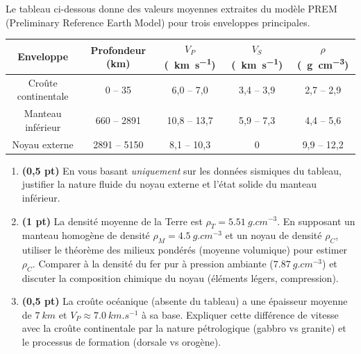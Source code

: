 \documentclass[11pt]{article}
\begin{document}
\begin{exercice}
Le tableau ci-dessous donne des valeurs moyennes extraites du modèle PREM (Preliminary Reference Earth Model) pour trois enveloppes principales.

\begin{center}
\begin{tabular}{|c|c|c|c|c|}
\hline
\textbf{Enveloppe} & \textbf{Profondeur (km)} & $V_P$ (\SI{}{km.s^{-1}}) & $V_S$ (\SI{}{km.s^{-1}}) & $\rho$ (\SI{}{g.cm^{-3}}) \\
\hline
Croûte continentale & 0 -- 35 & 6,0 -- 7,0 & 3,4 -- 3,9 & 2,7 -- 2,9 \\
\hline
Manteau inférieur & 660 -- 2891 & 10,8 -- 13,7 & 5,9 -- 7,3 & 4,4 -- 5,6 \\
\hline
Noyau externe & 2891 -- 5150 & 8,1 -- 10,3 & 0 & 9,9 -- 12,2 \\
\hline
\end{tabular}
\end{center}

\begin{enumerate}
    \item \textbf{(0,5 pt)} En vous basant \textit{uniquement} sur les données sismiques du tableau, justifier la nature fluide du noyau externe et l'état solide du manteau inférieur.
    \item \textbf{(1 pt)} La densité moyenne de la Terre est $\rho_T = \SI{5,51}{g.cm^{-3}}$. En supposant un manteau homogène de densité $\rho_M = \SI{4,5}{g.cm^{-3}}$ et un noyau de densité $\rho_C$, utiliser le théorème des milieux pondérés (moyenne volumique) pour estimer $\rho_C$. Comparer à la densité du fer pur à pression ambiante ($\SI{7,87}{g.cm^{-3}}$) et discuter la composition chimique du noyau (éléments légers, compression).
    \item \textbf{(0,5 pt)} La croûte océanique (absente du tableau) a une épaisseur moyenne de $\SI{7}{km}$ et $V_P \approx \SI{7,0}{km.s^{-1}}$ à sa base. Expliquer cette différence de vitesse avec la croûte continentale par la nature pétrologique (gabbro vs granite) et le processus de formation (dorsale vs orogène).
\end{enumerate}
\end{exercice}
\end{document}
